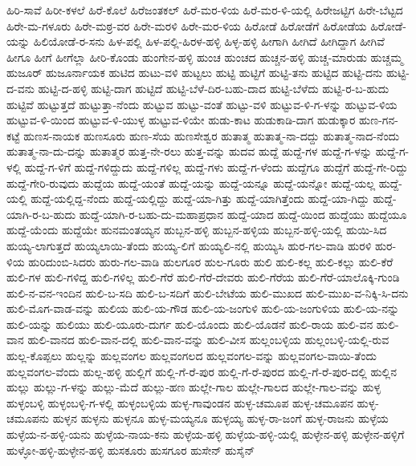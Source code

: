 ಹಿರಿ-ಸಾವೆ
ಹಿರೀ-ಕಳಲೆ
ಹಿರೆ-ಕೊಲೆ
ಹಿರೆಜಂತಕಲ್
ಹಿರೆ-ಮರ-ಳಿಯ
ಹಿರೆ-ಮರ-ಳಿ-ಯಲ್ಲಿ
ಹಿರೇಜಟ್ಟಿಗ
ಹಿರೇ-ಬೆಟ್ಟದ
ಹಿರೇ-ಮ-ಗಳೂರು
ಹಿರೇ-ಮಠ್ರ-ವರ
ಹಿರೇ-ಮರಳಿ
ಹಿರೇ-ಮರ-ಳಿಯ
ಹಿರೋಡೆ
ಹಿರೋಡೆಗೆ
ಹಿರೋಡೆಯ
ಹಿರೋಡೆ-ಯನ್ನು
ಹಿಲಿಯೋಡೆ-ರ-ಸನು
ಹಿಳ-ಪಲ್ಲಿ
ಹಿಳ-ಪಲ್ಲಿ-ಹಿರಳ-ಹಳ್ಳಿ
ಹಿಳ್ಳ-ಹಳ್ಳಿ
ಹೀಗಾಗಿ
ಹೀಗಿದೆ
ಹೀಗಿದ್ದಾಗ
ಹೀಗಿವೆ
ಹೀಗೂ
ಹೀಗೆ
ಹೀಗೆಲ್ಲಾ
ಹೀರಿ-ಕೊಂಡು
ಹುಂಗೇನ-ಹಳ್ಳಿ
ಹುಂಚ
ಹುಂಚದ
ಹುಚ್ಚನ-ಹಳ್ಳಿ
ಹುಚ್ಚ-ಮಾರುಡು
ಹುಚ್ಚಮ್ಮ
ಹುಜೂರ್
ಹುಜೂರ್ನಾಯಕ
ಹುಟಿದ
ಹುಟು-ವಳಿ
ಹುಟ್ಟಲು
ಹುಟ್ಟಿ
ಹುಟ್ಟಿಗೆ
ಹುಟ್ಟಿ-ತನು
ಹುಟ್ಟಿದ
ಹುಟ್ಟಿ-ದನು
ಹುಟ್ಟಿ-ದ-ವನು
ಹುಟ್ಟಿ-ದ-ಹಳ್ಳಿ
ಹುಟ್ಟಿ-ದಾಗ
ಹುಟ್ಟಿದೆ
ಹುಟ್ಟಿ-ಬೆಳೆ-ದಿರ-ಬಹು-ದಾದ
ಹುಟ್ಟಿ-ಬೆಳೆದು
ಹುಟ್ಟಿ-ರ-ಬ-ಹುದು
ಹುಟ್ಟಿವೆ
ಹುಟ್ಟುತ್ತದೆ
ಹುಟ್ಟುತ್ತಾ-ನೆಂದು
ಹುಟ್ಟುವ
ಹುಟ್ಟು-ವಂತೆ
ಹುಟ್ಟು-ವಳಿ
ಹುಟ್ಟುವ-ಳಿ-ಗ-ಳನ್ನು
ಹುಟ್ಟುವ-ಳಿಯ
ಹುಟ್ಟುವ-ಳಿ-ಯಿಂದ
ಹುಟ್ಟುವ-ಳಿ-ಯುಳ್ಳ
ಹುಟ್ಟುವ-ಳಿಯೇ
ಹುಡು-ಕಾಟ
ಹುಡುಕಾಡಿ-ದಾಗ
ಹುಡುಕ್ಕಾರ
ಹುಣ-ಗನ-ಕಟ್ಟೆ
ಹುಣಸ-ನಾಯಕ
ಹುಣಸೂರು
ಹುಣ-ಸೆಯ
ಹುಣಸೇಶ್ವರ
ಹುತಾತ್ಮ
ಹುತಾತ್ಮ-ನಾ-ದದ್ದು
ಹುತಾತ್ಮ-ನಾದ-ನೆಂದು
ಹುತಾತ್ಮ-ನಾ-ದು-ದನ್ನು
ಹುತಾತ್ಮರ
ಹುತ್ತ-ನೇ-ರಲು
ಹುತ್ತ-ವನ್ನು
ಹುದವ
ಹುದ್ದೆ
ಹುದ್ದೆ-ಗಳ
ಹುದ್ದೆ-ಗ-ಳನ್ನು
ಹುದ್ದೆ-ಗ-ಳಲ್ಲಿ
ಹುದ್ದೆ-ಗ-ಳಿಗೆ
ಹುದ್ದೆ-ಗಳಿದ್ದುದು
ಹುದ್ದೆ-ಗಳಿಲ್ಲ
ಹುದ್ದೆ-ಗಳು
ಹುದ್ದೆ-ಗ-ಳೆಂದು
ಹುದ್ದೆಗೂ
ಹುದ್ದೆಗೆ
ಹುದ್ದೆ-ಗೇ-ರಿದ್ದು
ಹುದ್ದೆ-ಗೇರಿ-ರುವುದು
ಹುದ್ದೆಯ
ಹುದ್ದೆ-ಯಂತೆ
ಹುದ್ದೆ-ಯನ್ನು
ಹುದ್ದೆ-ಯನ್ನೂ
ಹುದ್ದೆ-ಯನ್ನೋ
ಹುದ್ದೆ-ಯಲ್ಲ
ಹುದ್ದೆ-ಯಲ್ಲಿ
ಹುದ್ದೆ-ಯಲ್ಲಿದ್ದ-ನೆಂದು
ಹುದ್ದೆ-ಯಲ್ಲಿದ್ದು
ಹುದ್ದೆ-ಯಾ-ಗಿತ್ತು
ಹುದ್ದೆ-ಯಾಗಿತ್ತೆಂದು
ಹುದ್ದೆ-ಯಾ-ಗಿದ್ದು
ಹುದ್ದೆ-ಯಾಗಿ-ರ-ಬ-ಹುದು
ಹುದ್ದೆ-ಯಾಗಿ-ರ-ಬಹು-ದು-ಮಹಾಪ್ರಧಾನ
ಹುದ್ದೆ-ಯಾದ
ಹುದ್ದೆ-ಯಿಂದ
ಹುದ್ದೆಯು
ಹುದ್ದೆಯೂ
ಹುದ್ದೆ-ಯೆಂದು
ಹುದ್ದೆಯೇ
ಹುನಮಂತಯ್ಯನ
ಹುಬ್ಬನ-ಹಳ್ಳಿ
ಹುಬ್ಬನ-ಹಳ್ಳಿಯ
ಹುಬ್ಬನ-ಹಳ್ಳಿ-ಯಲ್ಲಿ
ಹುಯಿ-ಸಿದ
ಹುಯ್ಯ-ಲಾಗುತ್ತದೆ
ಹುಯ್ಯಲಾಯಿ-ತೆಂದು
ಹುಯ್ಯ-ಲಿಗೆ
ಹುಯ್ಯಲಿ-ನಲ್ಲಿ
ಹುಯ್ಯಿಸಿ
ಹುರ-ಗಲ-ವಾಡಿ
ಹುರಳಿ
ಹುರ-ಳಿಯ
ಹುರಿದುಂಬಿ-ಸಿದರು
ಹುರು-ಗಲ-ವಾಡಿ
ಹುಲಗೂರ
ಹುಲ-ಗೂರು
ಹುಲಿ
ಹುಲಿ-ಕಲ್ಲ
ಹುಲಿ-ಕಲ್ಲು
ಹುಲಿ-ಕೆರೆ
ಹುಲಿ-ಗಳ
ಹುಲಿ-ಗಳಿದ್ದ
ಹುಲಿ-ಗಳಿಲ್ಲ
ಹುಲಿ-ಗೆರೆ
ಹುಲಿ-ಗೆರೆ-ದೇವರು
ಹುಲಿ-ಗೆರೆಯ
ಹುಲಿ-ಗೆರೆ-ಯಾಲೊಕ್ಕಿ-ಗುಂಡಿ
ಹುಲಿ-ನ-ವನ-ಇಂದಿನ
ಹುಲಿ-ಬ-ಸದಿ
ಹುಲಿ-ಬ-ಸದಿಗೆ
ಹುಲಿ-ಬೇಟೆಯ
ಹುಲಿ-ಮುಖದ
ಹುಲಿ-ಮುಖ-ವ-ನಿಕ್ಕಿ-ಸಿ-ದನು
ಹುಲಿ-ಮೊಗ-ವಾಡ-ವನ್ನು
ಹುಲಿಯ
ಹುಲಿ-ಯ-ಗೌಡ
ಹುಲಿ-ಯ-ಜಂಗುಳಿ
ಹುಲಿ-ಯ-ಜಂಗುಳಿಯ
ಹುಲಿ-ಯ-ನನ್ನು
ಹುಲಿ-ಯನ್ನು
ಹುಲಿಯು
ಹುಲಿ-ಯೂರು-ದುರ್ಗ
ಹುಲಿ-ಯೊಂದು
ಹುಲಿ-ಯೊಡನೆ
ಹುಲಿ-ರಾಯ
ಹುಲಿ-ವನ
ಹುಲಿ-ವಾನ
ಹುಲಿ-ವಾನದ
ಹುಲಿ-ವಾನ-ದಲ್ಲಿ
ಹುಲಿ-ವಾನ-ವನ್ನು
ಹುಲಿ-ವೀಸ
ಹುಲ್ಲಂಬಳ್ಳಿಯ
ಹುಲ್ಲಂಬಳ್ಳಿ-ಯಲ್ಲಿ-ರುವ
ಹುಲ್ಲ-ಕೊಪ್ಪಲು
ಹುಲ್ಲನ್ನು
ಹುಲ್ಲವಂಗಲ
ಹುಲ್ಲವಂಗಲದ
ಹುಲ್ಲವಂಗಲ-ವನ್ನು
ಹುಲ್ಲವಂಗಲ-ವಾಯಿ-ತೆಂದು
ಹುಲ್ಲವಂಗಲ-ವೆಂದು
ಹುಲ್ಲ-ಹಳ್ಳಿ
ಹುಲ್ಲಿಗೆ
ಹುಲ್ಲಿ-ಗೆ-ರೆ-ಪುರ
ಹುಲ್ಲಿ-ಗೆ-ರೆ-ಪುರದ
ಹುಲ್ಲಿ-ಗೆ-ರೆ-ಪುರ-ದಲ್ಲಿ
ಹುಲ್ಲಿನ
ಹುಲ್ಲು
ಹುಲ್ಲು-ಗ-ಳನ್ನು
ಹುಲ್ಲು-ಮೆದೆ
ಹುಲ್ಲು-ಹಣ
ಹುಲ್ಲೇ-ಗಾಲ
ಹುಲ್ಲೇ-ಗಾಲದ
ಹುಲ್ಲೇ-ಗಾಲ-ವನ್ನು
ಹುಳ್ಳ
ಹುಳ್ಳಂಬಳ್ಳಿ
ಹುಳ್ಳಂಬಳ್ಳಿ-ಗ-ಳಲ್ಲಿ
ಹುಳ್ಳಂಬಳ್ಳಿಯ
ಹುಳ್ಳ-ಗಾವುಂಡನ
ಹುಳ್ಳ-ಚಮೂಪ
ಹುಳ್ಳ-ಚಮೂಪನ
ಹುಳ್ಳ-ಚಮೂಪನು
ಹುಳ್ಳನ
ಹುಳ್ಳನು
ಹುಳ್ಳನೂ
ಹುಳ್ಳ-ಮಯ್ಯನೂ
ಹುಳ್ಳಯ್ಯ
ಹುಳ್ಳ-ರಾ-ಜಂಗೆ
ಹುಳ್ಳ-ರಾಜನು
ಹುಳ್ಳೆಯ
ಹುಳ್ಳೆಯ-ನ-ಹಳ್ಳಿ-ಯನು
ಹುಳ್ಳೆಯ-ನಾಯ-ಕನು
ಹುಳ್ಳೆಯ-ಹಳ್ಳಿ
ಹುಳ್ಳೆಯ-ಹಳ್ಳಿ-ಯಲ್ಲಿ
ಹುಳ್ಳೇನ-ಹಳ್ಳಿ
ಹುಳ್ಳೇನ-ಹಳ್ಳಿಗೆ
ಹುಳ್ಳೋ-ಹಳ್ಳಿ-ಹುಳ್ಳೇನ-ಹಳ್ಳಿ
ಹುಸಕೂರು
ಹುಸಗೂರ
ಹುಸೇನ್
ಹುಸೈನ್
